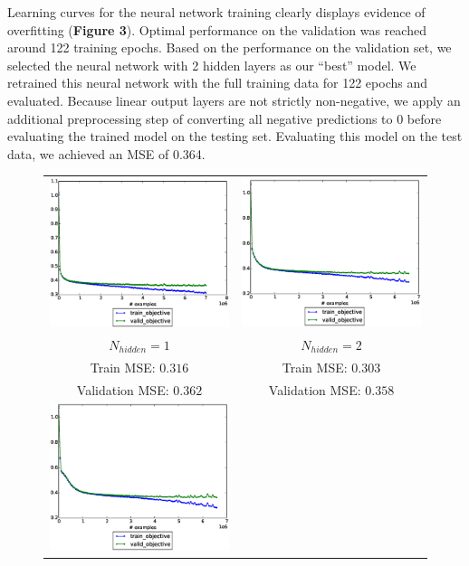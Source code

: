 \documentclass[12pt] {article}
\renewcommand{\baselinestretch}{1.1} %
\begin{document}
Learning curves for the neural network training clearly displays evidence of overfitting (\textbf{Figure 3}). Optimal performance on the validation was reached around 122 training epochs. Based on the performance on the validation set, we selected the neural network with 2 hidden layers as our ``best'' model. We retrained this neural network with the full training data for 122 epochs and evaluated. Because linear output layers are not strictly non-negative, we apply an additional preprocessing step of converting all negative predictions to 0 before evaluating the trained model on the testing set. Evaluating this model on the test data, we achieved an MSE of 0.364.
\renewcommand{\baselinestretch}{1.0} %
\begin{figure}[h!] \centering
\begin{tabular}{cc}
\includegraphics[trim = 0mm 20mm 0mm 10mm, clip=true, width=.45\textwidth]{figdir/nn_mse_1.eps} &
\includegraphics[trim = 0mm 20mm 0mm 10mm, clip=true, width=.45\textwidth]{figdir/nn_mse_2.eps} \\
$N_{hidden}=1$ & $N_{hidden}=2$ \\
Train MSE: $0.316$ & Train MSE: $0.303$ \\
Validation MSE: $0.362$ & Validation MSE: $0.358$ \\
\includegraphics[trim = 0mm 20mm 0mm 10mm, clip=true, width=.45\textwidth]{figdir/nn_mse_3.eps} &

\end{tabular}
\end{figure}
\end{document}
